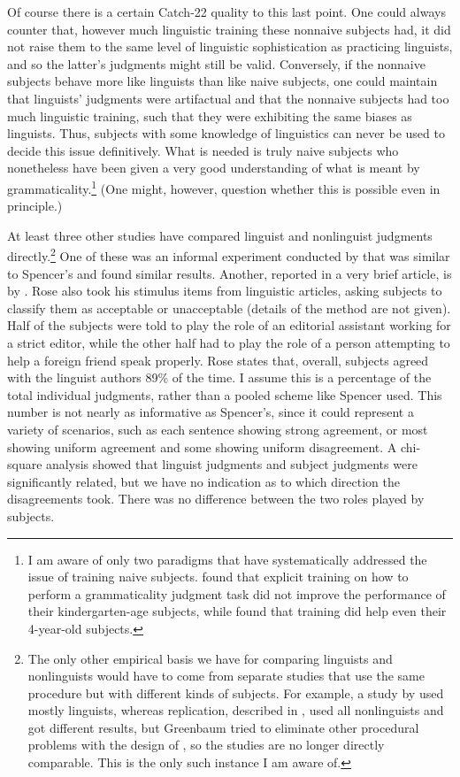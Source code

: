 \noindent
Of course there is a certain Catch-22 quality to this last point. One could always counter that, however much linguistic training these nonnaive subjects had, it did not raise them to the same level of linguistic sophistication as practicing linguists, and so the latter's judgments might still be valid. Conversely, if the nonnaive subjects behave more like linguists than like naive subjects, one could maintain that linguists' judgments were artifactual and that the nonnaive subjects had too much linguistic training, such that they were exhibiting the same biases as linguists. Thus, subjects with some knowledge of linguistics can never be used to decide this issue definitively. What is needed is truly naive subjects who nonetheless have been given a very good understanding of what is meant by grammaticality.\footnote{I am aware of only two paradigms that have systematically addressed the issue of training naive subjects. \citet{RyanEtAl1984} found that explicit training on how to perform a grammaticality judgment task did not improve the performance of their kindergarten-age subjects, while \citet{McDanielEtAl1990} found that training did help even their 4-year-old subjects.}
 (One might, however, question whether this is possible even in principle.)


At least three other studies have compared linguist and nonlinguist judgments directly.\footnote{The only other empirical basis we have for comparing linguists and nonlinguists would have to come from separate studies that use the same procedure but with different kinds of subjects. For example, a study by  \citet{ElliotEtAl1969} used mostly linguists, whereas  replication, described in , used all nonlinguists and got different results, but Greenbaum tried to eliminate other procedural problems with the design of \citet{ElliotEtAl1969}, so the studies are no longer directly comparable. This is the only such instance I am aware of.
}
 One of these was an informal experiment conducted by \citet[93, fn. 4]{Greenbaum1988} that was similar to Spencer's and found similar results. Another, reported in a very brief article, is by \citet{Rose1973}. Rose also took his stimulus items from linguistic articles, asking subjects to classify them as acceptable or unacceptable (details of the method are not given). Half of the subjects were told to play the role of an editorial assistant working for a strict editor, while the other half had to play the role of a person attempting to help a foreign friend speak properly. Rose states that, overall, subjects agreed with the linguist authors 89\% of the time. I assume this is a percentage of the total individual judgments, rather than a pooled scheme like Spencer used. This number is not nearly as informative as Spencer's, since it could represent a variety of scenarios, such as each sentence showing strong agreement, or most showing uniform agreement and some showing uniform disagreement. A chi-square analysis showed that linguist judgments and subject judgments were significantly related, but we have no indication as to which direction the disagreements took. There was no difference between the two roles played by subjects.

